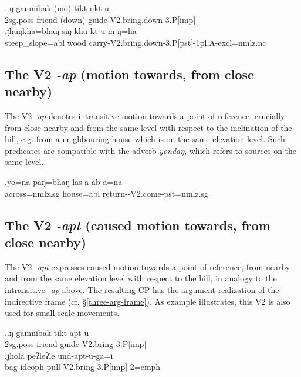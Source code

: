 \ex.\ag.ŋ-gamnibak (mo) tikt-ukt-u\\
{\sc 2sg.poss-}friend (down) guide{\sc -V2.bring.down-3.P[imp]}\\
\bg.ʈhuŋkha=bhaŋ siŋ khu-kt-u-m-ŋ=ha\\
steep\_slope{\sc =abl} wood carry{\sc -V2.bring.down-3.P[pst]-1pl.A-excl=nmlz.nc}\\


\subsection{The V2 \emph{-ap} (motion towards, from close nearby)} \label{V2-come}

The V2 \emph{-ap}  denotes intransitive motion towards a point of reference, crucially from close nearby and from the same  level with respect to the inclination of the hill, e.g. from a neighbouring house which is on the same elevation level. Such predicates are compatible with the adverb \emph{yondaŋ}, which refers to sources on the same level.

\exg.yo=na paŋ=bhaŋ las-a-ab-a=na\\
across{\sc =nmlz.sg} house{\sc =abl} return-{\sc [3sg]-V2.come-pst=nmlz.sg}\\


\subsection{The V2 \emph{-apt} (caused motion towards, from close nearby)} \label{V2-bring}%

The V2 \emph{-apt}   expresses caused motion towards  a point of reference, from nearby and from the same elevation level with respect to the hill, in analogy to the intransitive \emph{-ap} above. The resulting CP has the argument realization of the indirective frame (cf. §\ref{three-arg-frame}). As example \Next[b] illustrates, this V2 is also used for small-scale movements.

\ex.\ag.ŋ-gamnibak tikt-apt-u\\
{\sc 2sg.poss-}friend  guide{\sc -V2.bring-3.P[imp]}\\
\bg.jhola peʔleʔle und-apt-u-ga=i\\
bag {\sc ideoph} pull{\sc -V2.bring-3.P[imp]-2=emph}\\


